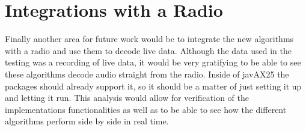 \section{Integrations with a Radio}
Finally another area for future work would be to integrate the new algorithms with a radio and use them to decode live data. Although the data used in the testing was a recording of live data, it would be very gratifying to be able to see these algorithms decode audio straight from the radio. Inside of javAX25 the packages should already support it, so it should be a matter of just setting it up and letting it run. This analysis would allow for verification of the implementations functionalities as well as to be able to see how the different algorithms perform side by side in real time.

